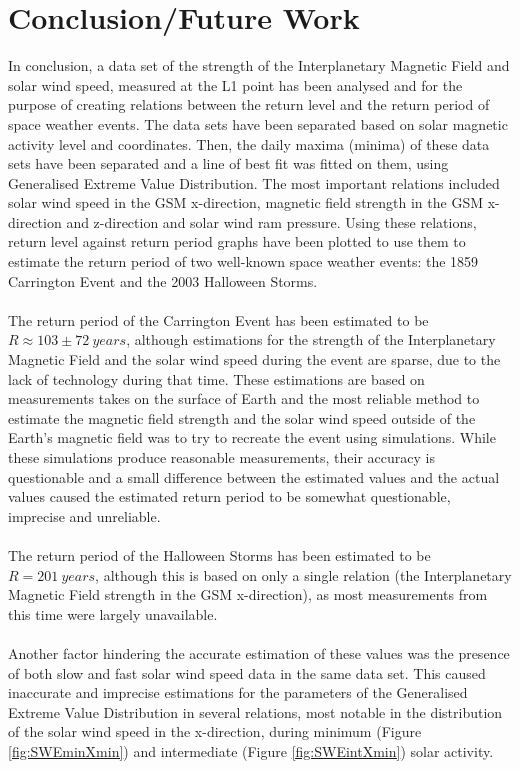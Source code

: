 \documentclass[12pt]{article}
\begin{document}
\section{Conclusion/Future Work}\label{sec:conclusions}
    In conclusion, a data set of the strength of the Interplanetary Magnetic Field and solar wind speed, measured at the L1 point has been analysed and for the purpose of creating relations between the return level and the return period of space weather events. The data sets have been separated based on solar magnetic activity level and coordinates. Then, the daily maxima (minima) of these data sets have been separated and a line of best fit was fitted on them, using Generalised Extreme Value Distribution. The most important relations included solar wind speed in the GSM x-direction, magnetic field strength in the GSM x-direction and z-direction and solar wind ram pressure. Using these relations, return level against return period graphs have been plotted to use them to estimate the return period of two well-known space weather events: the 1859 Carrington Event and the 2003 Halloween Storms.\\ \\
    The return period of the Carrington Event has been estimated to be $R\approx 103\pm 72\ years$, although estimations for the strength of the Interplanetary Magnetic Field and the solar wind speed during the event are sparse, due to the lack of technology during that time. These estimations are based on measurements takes on the surface of Earth and the most reliable method to estimate the magnetic field strength and the solar wind speed outside of the Earth's magnetic field was to try to recreate the event using simulations. While these simulations produce reasonable measurements, their accuracy is questionable and a small difference between the estimated values and the actual values caused the estimated return period to be somewhat questionable, imprecise and unreliable.\\ \\
    The return period of the Halloween Storms has been estimated to be $R=201\ years$, although this is based on only a single relation (the Interplanetary Magnetic Field strength in the GSM x-direction), as most measurements from this time were largely unavailable.\\ \\
    Another factor hindering the accurate estimation of these values was the presence of both slow and fast solar wind speed data in the same data set. This caused inaccurate and imprecise estimations for the parameters of the Generalised Extreme Value Distribution in several relations, most notable in the distribution of the solar wind speed in the x-direction, during minimum (Figure \ref{fig:SWEminXmin}) and intermediate (Figure \ref{fig:SWEintXmin}) solar activity.\\ \\
\end{document}
